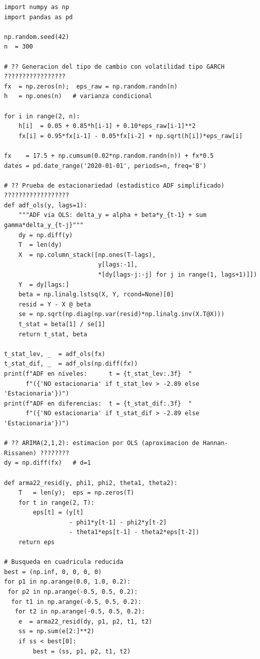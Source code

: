 \documentclass[12pt,a4paper]{article}
\begin{document}
\begin{lstlisting}[style=python, caption={Ejemplo 3: ARIMA(2,1,2) en tipo de cambio},
                   label={cod:ej3}]
import numpy as np
import pandas as pd

np.random.seed(42)
n  = 300

# ?? Generacion del tipo de cambio con volatilidad tipo GARCH ?????????????????
fx  = np.zeros(n);  eps_raw = np.random.randn(n)
h   = np.ones(n)   # varianza condicional

for i in range(2, n):
    h[i]  = 0.05 + 0.85*h[i-1] + 0.10*eps_raw[i-1]**2
    fx[i] = 0.95*fx[i-1] - 0.05*fx[i-2] + np.sqrt(h[i])*eps_raw[i]

fx    = 17.5 + np.cumsum(0.02*np.random.randn(n)) + fx*0.5
dates = pd.date_range('2020-01-01', periods=n, freq='B')

# ?? Prueba de estacionariedad (estadistico ADF simplificado) ??????????????????
def adf_ols(y, lags=1):
    """ADF via OLS: delta_y = alpha + beta*y_{t-1} + sum gamma*delta_y_{t-j}"""
    dy = np.diff(y)
    T  = len(dy)
    X  = np.column_stack([np.ones(T-lags),
                          y[lags:-1],
                          *[dy[lags-j:-j] for j in range(1, lags+1)]])
    Y  = dy[lags:]
    beta = np.linalg.lstsq(X, Y, rcond=None)[0]
    resid = Y - X @ beta
    se = np.sqrt(np.diag(np.var(resid)*np.linalg.inv(X.T@X)))
    t_stat = beta[1] / se[1]
    return t_stat, beta

t_stat_lev, _  = adf_ols(fx)
t_stat_dif, _  = adf_ols(np.diff(fx))
print(f"ADF en niveles:      t = {t_stat_lev:.3f}  "
      f"({'NO estacionaria' if t_stat_lev > -2.89 else 'Estacionaria'})")
print(f"ADF en diferencias:  t = {t_stat_dif:.3f}  "
      f"({'NO estacionaria' if t_stat_dif > -2.89 else 'Estacionaria'})")

# ?? ARIMA(2,1,2): estimacion por OLS (aproximacion de Hannan-Rissanen) ????????
dy = np.diff(fx)   # d=1

def arma22_resid(y, phi1, phi2, theta1, theta2):
    T   = len(y);  eps = np.zeros(T)
    for t in range(2, T):
        eps[t] = (y[t]
                  - phi1*y[t-1] - phi2*y[t-2]
                  - theta1*eps[t-1] - theta2*eps[t-2])
    return eps

# Busqueda en cuadricula reducida
best = (np.inf, 0, 0, 0, 0)
for p1 in np.arange(0.0, 1.0, 0.2):
 for p2 in np.arange(-0.5, 0.5, 0.2):
  for t1 in np.arange(-0.5, 0.5, 0.2):
   for t2 in np.arange(-0.5, 0.5, 0.2):
    e  = arma22_resid(dy, p1, p2, t1, t2)
    ss = np.sum(e[2:]**2)
    if ss < best[0]:
        best = (ss, p1, p2, t1, t2)


\end{lstlisting}
\end{document}
